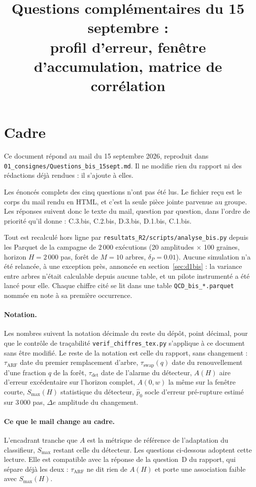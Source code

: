 \documentclass[11pt,a4paper]{article}
\title{Questions complémentaires du 15 septembre :\\
profil d'erreur, fenêtre d'accumulation, matrice de corrélation}
\author{}
\date{}
\begin{document}
\maketitle

\section*{Cadre}

Ce document répond au mail du 15 septembre 2026, reproduit dans
\texttt{01\_consignes/Questions\_bis\_15sept.md}. Il ne modifie rien du rapport ni des
rédactions déjà rendues : il s'ajoute à elles.

Les énoncés complets des cinq questions n'ont pas été lus. Le fichier reçu est le corps du
mail rendu en HTML, et c'est la seule pièce jointe parvenue au groupe. Les réponses suivent
donc le texte du mail, question par question, dans l'ordre de priorité qu'il donne :
C.3.bis, C.2.bis, D.3.bis, D.1.bis, C.1.bis.

Tout est recalculé hors ligne par \texttt{resultats\_R2/scripts/analyse\_bis.py} depuis les
Parquet de la campagne de $2\,000$ exécutions (20 amplitudes $\times$ 100 graines,
horizon $H = 2\,000$ pas, forêt de $M = 10$ arbres, $\delta_P = 0.01$). Aucune
simulation n'a été relancée, à une exception près, annoncée en section~\ref{sec:d1bis} :
la variance entre arbres n'était calculable depuis aucune table, et un pilote instrumenté
a été lancé pour elle. Chaque chiffre cité se lit dans une table
\texttt{QCD\_bis\_*.parquet} nommée en note à sa première occurrence.

\paragraph{Notation.} Les nombres suivent la notation décimale du reste du dépôt, point
décimal, pour que le contrôle de traçabilité \texttt{verif\_chiffres\_tex.py} s'applique à ce
document sans être modifié. Le reste de la notation est celle du rapport, sans changement : $\tau_{\mathrm{ARF}}$ date du
premier remplacement d'arbre, $\tau_{\mathrm{swap}}(q)$ date du renouvellement d'une
fraction $q$ de la forêt, $\tau_{\mathrm{det}}$ date de l'alarme du détecteur,
$A(H)$ aire d'erreur excédentaire sur l'horizon complet, $A(0,w)$ la même sur la fenêtre
courte, $S_{\max}(H)$ statistique du détecteur, $\hat{p}_0$ socle d'erreur pré-rupture
estimé sur $3\,000$ pas, $\Delta e$ amplitude du changement.

\paragraph{Ce que le mail change au cadre.} L'encadrant tranche que $A$ est la métrique de
référence de l'adaptation du classifieur, $S_{\max}$ restant celle du détecteur. Les
questions ci-dessous adoptent cette lecture. Elle est compatible avec la réponse de la
question~D du rapport, qui sépare déjà les deux : $\tau_{\mathrm{ARF}}$ ne dit rien de
$A(H)$ et porte une association faible avec $S_{\max}(H)$.
\end{document}
